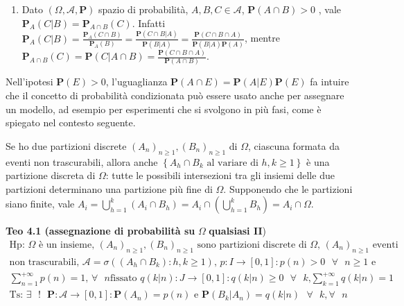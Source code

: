 \documentclass{article}
\begin{document}
\begin{enumerate}
\item Dato $\left( \Omega ,\mathcal{A},\mathbf{P}\right) $ spazio di
probabilit\`{a}, $A,B,C\in \mathcal{A}$, $\mathbf{P}\left( A\cap B\right) >0$%
, vale $\mathbf{P}_{A}\left( C|B\right) =\mathbf{P}_{A\cap B}\left( C\right) 
$. Infatti $\mathbf{P}_{A}\left( C|B\right) =\frac{\mathbf{P}_{A}\left(
C\cap B\right) }{\mathbf{P}_{A}\left( B\right) }=\frac{\mathbf{P}\left(
C\cap B|A\right) }{\mathbf{P}\left( B|A\right) }=\frac{\mathbf{P}\left(
C\cap B\cap A\right) }{\mathbf{P}\left( B|A\right) \mathbf{P}\left( A\right) 
}$, mentre $\mathbf{P}_{A\cap B}\left( C\right) =\mathbf{P}\left( C|A\cap
B\right) =\frac{\mathbf{P}\left( C\cap B\cap A\right) }{\mathbf{P}\left(
A\cap B\right) }$.
\end{enumerate}

Nell'ipotesi $\mathbf{P}\left( E\right) >0$, l'uguaglianza $\mathbf{P}\left(
A\cap E\right) =\mathbf{P}\left( A|E\right) \mathbf{P}\left( E\right) $ fa
intuire che il concetto di probabilit\`{a} condizionata pu\`{o} essere usato
anche per assegnare un modello, ad esempio per esperimenti che si svolgono
in pi\`{u} fasi, come \`{e} spiegato nel contesto seguente.

Se ho due partizioni discrete $\left( A_{n}\right) _{n\geq 1},\left(
B_{n}\right) _{n\geq 1}$ di $\Omega $, ciascuna formata da eventi non
trascurabili, allora anche $\left\{ A_{h}\cap B_{k}\text{ al variare di }%
h,k\geq 1\right\} $ \`{e} una partizione discreta di $\Omega $: tutte le
possibili intersezioni tra gli insiemi delle due partizioni determinano una
partizione pi\`{u} fine di $\Omega $. Supponendo che le partizioni siano
finite, vale $A_{i}=\bigcup_{h=1}^{k}\left( A_{i}\cap B_{h}\right)
=A_{i}\cap \left( \bigcup_{h=1}^{k}B_{h}\right) =A_{i}\cap \Omega $.

\textbf{Teo 4.1 (assegnazione di probabilit\`{a} su }$\Omega $ \textbf{%
qualsiasi II})%
\begin{gather*}
\text{Hp: }\Omega \text{ \`{e} un insieme, }\left( A_{n}\right) _{n\geq
1},\left( B_{n}\right) _{n\geq 1}\text{ sono partizioni discrete di }\Omega 
\text{, }\left( A_{n}\right) _{n\geq 1}\text{ eventi} \\
\text{non trascurabili, }\mathcal{A}=\sigma \left( \left( A_{h}\cap
B_{k}\right) :h,k\geq 1\right) \text{, }p:I\rightarrow \left[ 0,1\right]
:p\left( n\right) >0\text{ }\forall \text{ }n\geq 1\text{ e} \\
\sum_{n=1}^{+\infty }p\left( n\right) =1\text{, }\forall \text{ }n\text{
fissato }q\left( k|n\right) :J\rightarrow \left[ 0,1\right] :q\left(
k|n\right) \geq 0\text{ }\forall \text{ }k\text{,}\sum_{k=1}^{+\infty
}q\left( k|n\right) =1 \\
\text{Ts: }\exists \text{ }!\text{ }\mathbf{P}:\mathcal{A}\rightarrow \left[
0,1\right] :\mathbf{P}\left( A_{n}\right) =p\left( n\right) \text{ e }%
\mathbf{P}\left( B_{k}|A_{n}\right) =q\left( k|n\right) \text{ }\forall 
\text{ }k,\forall \text{ }n
\end{gather*}
\end{document}
